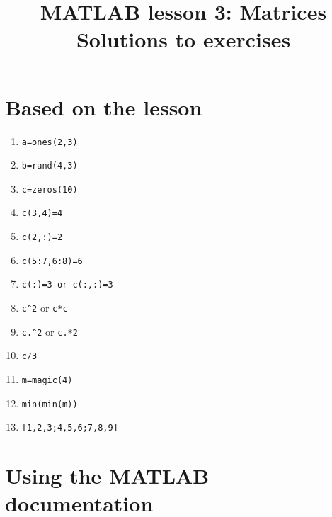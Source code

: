 \documentclass[a4paper]{article}
\title{MATLAB lesson 3: Matrices\\Solutions to exercises}
\date{}
\begin{document}
\maketitle

\section{Based on the lesson}

\begin{enumerate}
	\item \lstinline[style=Matlab-editor]!a=ones(2,3)!
	\item \lstinline[style=Matlab-editor]!b=rand(4,3)!
	\item \lstinline[style=Matlab-editor]!c=zeros(10)!
	\item \lstinline[style=Matlab-editor]!c(3,4)=4!
	\item \lstinline[style=Matlab-editor]!c(2,:)=2!
	\item \lstinline[style=Matlab-editor]!c(5:7,6:8)=6!
	\item \lstinline[style=Matlab-editor]!c(:)=3 or c(:,:)=3!
	\item \lstinline[style=Matlab-editor]!c^2! or \lstinline[style=Matlab-editor]!c*c!
	\item \lstinline[style=Matlab-editor]!c.^2! or \lstinline[style=Matlab-editor]!c.*2!
	\item \lstinline[style=Matlab-editor]!c/3!
	\item \lstinline[style=Matlab-editor]!m=magic(4)!
	\item \lstinline[style=Matlab-editor]!min(min(m))!
	\item \lstinline[style=Matlab-editor]![1,2,3;4,5,6;7,8,9]!
\end{enumerate}

\medskip

\section{Using the MATLAB documentation}
\end{document}
